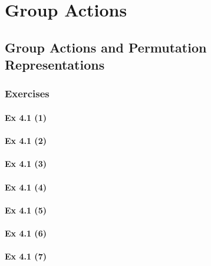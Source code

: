 \setcounter{chapter}{0}
\renewcommand{\thechapter}{4}
\chapter{Group Actions}\label{ch:4}
\setcounter{equation}{0}	        %

\section{Group Actions and Permutation\\ Representations}\label{sec:4.1}	
\subsection*{Exercises}\label{sec:4.1_Exercises}

\subsubsection{Ex 4.1 (1)}\label{sec:Ex_4.1.1}

\subsubsection{Ex 4.1 (2)}\label{sec:Ex_4.1.2}

\subsubsection{Ex 4.1 (3)}\label{sec:Ex_4.1.3}

\subsubsection{Ex 4.1 (4)}\label{sec:Ex_4.1.4}

\subsubsection{Ex 4.1 (5)}\label{sec:Ex_4.1.5}

\subsubsection{Ex 4.1 (6)}\label{sec:Ex_4.1.6}

\subsubsection{Ex 4.1 (7)}\label{sec:Ex_4.1.7}

